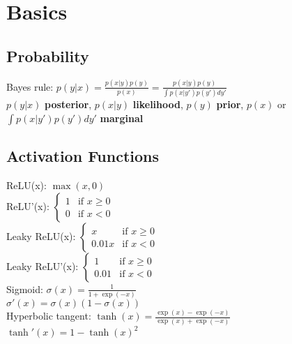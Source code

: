 \section{Basics}
\subsection{Probability}
Bayes rule: $p(y|x) = \frac{p(x|y)p(y)}{p(x)} = \frac{p(x|y)p(y)}{\int p(x|y')p(y')dy'}$\\
$p(y|x)$ \textbf{posterior}, $p(x|y)$ \textbf{likelihood}, $p(y)$ \textbf{prior}, $p(x)$ or $\int p(x|y')p(y')dy'$ \textbf{marginal}
\subsection{Activation Functions}
ReLU(x): $\max(x, 0)$\\
ReLU'(x): $\begin{cases}
		1 & \text{if } x \geq 0 \\
		0 & \text{if } x < 0
	\end{cases}$\\
Leaky ReLU(x): $\begin{cases}
		x     & \text{if } x \geq 0 \\
		0.01x & \text{if } x < 0
	\end{cases}$\\
Leaky ReLU'(x): $\begin{cases}
		1    & \text{if } x \geq 0 \\
		0.01 & \text{if } x < 0
	\end{cases}$\\
Sigmoid: $\sigma(x) = \frac{1}{1 + \exp(-x)}$\\
$\sigma'(x) = \sigma(x)(1-\sigma(x))$\\
Hyperbolic tangent: $\tanh(x) = \frac{\exp(x)-\exp(-x)}{\exp(x)+\exp(-x)}$\\
$\tanh'(x) = 1 - \tanh(x)^2$